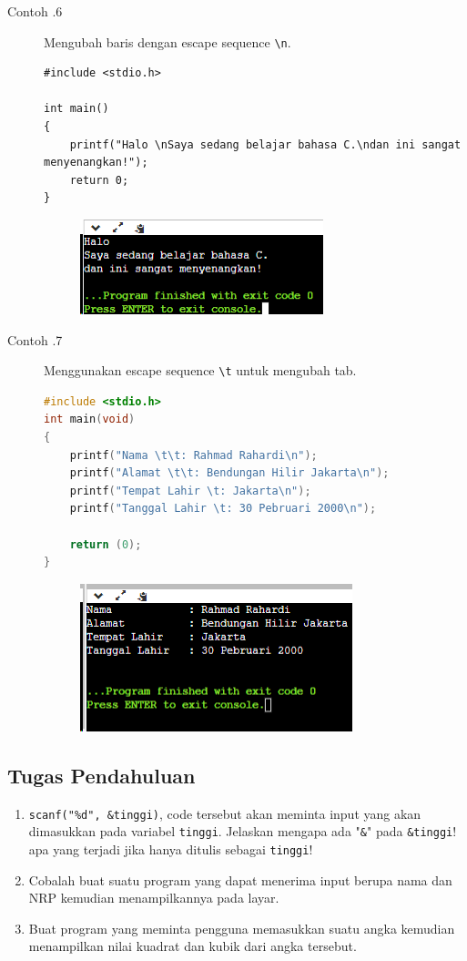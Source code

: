 \begin{description}
	\item[Contoh \thesubsection.6] Mengubah baris dengan escape sequence \verb*|\n|.
		\begin{lstlisting}
#include <stdio.h>

int main() 
{
	printf("Halo \nSaya sedang belajar bahasa C.\ndan ini sangat menyenangkan!");
	return 0;
}
	\end{lstlisting}
		\begin{figure}[H]
			\centering
			\includegraphics[width=0.5\linewidth]{P1/img/screenshot0006.png}
			\caption{}
			\label{fig:screenshot0006}
		\end{figure}

	\item[Contoh \thesubsection.7] Menggunakan escape sequence \verb*|\t| untuk mengubah tab.
		\begin{lstlisting}[language=c]
#include <stdio.h>
int main(void)
{
	printf("Nama \t\t: Rahmad Rahardi\n");
	printf("Alamat \t\t: Bendungan Hilir Jakarta\n");
	printf("Tempat Lahir \t: Jakarta\n");
	printf("Tanggal Lahir \t: 30 Pebruari 2000\n");
	
	return (0);
}
\end{lstlisting}
		\begin{figure}[H]
			\centering
			\includegraphics[width=0.5\linewidth]{P1/img/screenshot0007.png}
			\caption{}
			\label{fig:screenshot0007}
		\end{figure}
\end{description}

\subsection{Tugas Pendahuluan}
\begin{enumerate}
	\item \verb|scanf("%d", &tinggi)|, code tersebut akan meminta input yang akan dimasukkan pada variabel \verb|tinggi|. Jelaskan mengapa ada "\verb|&|" pada \verb|&tinggi|! apa yang terjadi jika hanya ditulis sebagai \verb|tinggi|!
	\item Cobalah buat suatu program yang dapat menerima input berupa nama dan NRP kemudian menampilkannya pada layar.
	\item Buat program yang meminta pengguna memasukkan suatu angka kemudian menampilkan nilai kuadrat dan kubik dari angka tersebut.
\end{enumerate}

